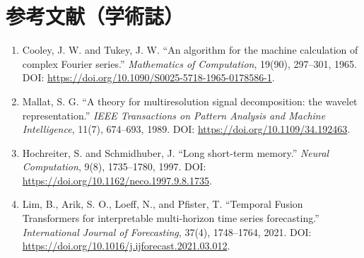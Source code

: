 \section*{参考文献（学術誌）}
\begin{enumerate}[leftmargin=2.4em]
\item Cooley, J. W. and Tukey, J. W. ``An algorithm for the machine calculation of complex Fourier series.'' \textit{Mathematics of Computation}, 19(90), 297--301, 1965. DOI: \url{https://doi.org/10.1090/S0025-5718-1965-0178586-1}.
\item Mallat, S. G. ``A theory for multiresolution signal decomposition: the wavelet representation.'' \textit{IEEE Transactions on Pattern Analysis and Machine Intelligence}, 11(7), 674--693, 1989. DOI: \url{https://doi.org/10.1109/34.192463}.
\item Hochreiter, S. and Schmidhuber, J. ``Long short-term memory.'' \textit{Neural Computation}, 9(8), 1735--1780, 1997. DOI: \url{https://doi.org/10.1162/neco.1997.9.8.1735}.
\item Lim, B., Arik, S. O., Loeff, N., and Pfister, T. ``Temporal Fusion Transformers for interpretable multi-horizon time series forecasting.'' \textit{International Journal of Forecasting}, 37(4), 1748--1764, 2021. DOI: \url{https://doi.org/10.1016/j.ijforecast.2021.03.012}.
\end{enumerate}
